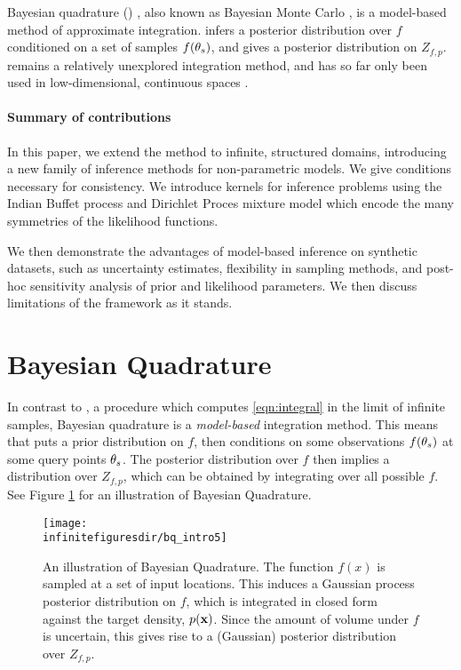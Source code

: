 
Bayesian quadrature (\bq{}) \cite{BZHermiteQuadrature}, also known as Bayesian Monte Carlo \cite{BZMonteCarlo}, is a model-based method of approximate integration.  \bq{} infers a posterior distribution over $f$ conditioned on a set of samples $f({\bf{\theta}}_s)$, and gives a posterior distribution on $Z_{f,p}$.  \bq{} remains a relatively unexplored integration method, and has so far only been used in low-dimensional, continuous spaces \cite{BZMonteCarlo}.

\paragraph{Summary of contributions} In this paper, we extend the \bq{} method to infinite, structured domains, introducing a new family of inference methods for non-parametric models.  We give conditions necessary for consistency.  We introduce kernels for inference problems using the Indian Buffet process and Dirichlet Proces mixture model which encode the many symmetries of the likelihood functions.

We then demonstrate the advantages of model-based inference on synthetic datasets, such as uncertainty estimates, flexibility in sampling methods, and post-hoc sensitivity analysis of prior and likelihood parameters.  We then discuss limitations of the framework as it stands.

\section{Bayesian Quadrature}

In contrast to \mcmc{}, a procedure which computes \eqref{eqn:integral} in the limit of infinite samples, Bayesian quadrature is a \emph{model-based} integration method.  This means that \bq{} puts a prior distribution on $f$, then conditions on some observations $f({\bf{\theta}}_s)$ at some query points ${\bf{\theta}}_s$.  The posterior distribution over $f$ then implies a distribution over $Z_{f,p}$, which can be obtained by integrating over all possible $f$.  See Figure \ref{fig:bq_intro} for an illustration of Bayesian Quadrature.

\begin{figure}
\centering
\texttt{[image: \\infinitefiguresdir/bq\_intro5]}
\caption{An illustration of Bayesian Quadrature.  The function $f(x)$ is sampled at a set of input locations.  This induces a Gaussian process posterior distribution on $f$, which is integrated in closed form against the target density, $p({\bf{x}})$.  Since the amount of volume under $f$ is uncertain, this gives rise to a (Gaussian) posterior distribution over $Z_{f,p}$.}
\label{fig:bq_intro}
\end{figure}

